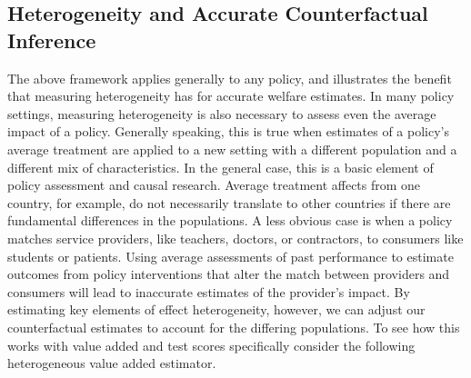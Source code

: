 \documentclass[12pt]{article}
\theoremstyle{definition}
\theoremstyle{definition}
\theoremstyle{definition}
\theoremstyle{definition}
\begin{document}
    
   \subsection{Heterogeneity and Accurate Counterfactual Inference}
   \label{va_hetero}
   
   The above framework applies generally to any policy, and illustrates the benefit that measuring heterogeneity has for accurate welfare estimates. In many policy settings, measuring heterogeneity is also necessary to assess even the average impact of a policy. Generally speaking, this is true when estimates of a policy's average treatment are applied to a new setting with a different population and a different mix of characteristics. In the general case, this is a basic element of policy assessment and causal research. Average treatment affects from one country, for example, do not necessarily translate to other countries if there are fundamental differences in the populations. A less obvious case is when a policy matches service providers, like teachers, doctors, or contractors, to consumers like students or patients. Using average assessments of past performance to estimate outcomes from policy interventions that alter the match between providers and consumers will lead to inaccurate estimates of the provider's impact. By estimating key elements of effect heterogeneity, however, we can adjust our counterfactual estimates to account for the differing populations. To see how this works with value added and test scores specifically consider the following heterogeneous value added estimator. 
   
\end{document}
